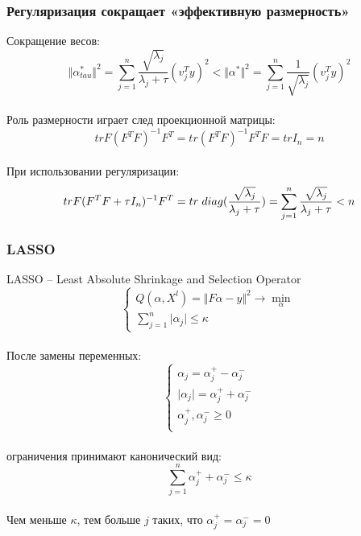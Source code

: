 \documentclass[12pt]{beamer}
\begin{document}
\begin{frame}\frametitle{Регуляризация сокращает «эффективную размерность»}
Сокращение весов:\\
$$\Vert \alpha_{tau}^* \Vert^2 = \sum\limits_{j=1}^n \frac{\sqrt{\lambda_j}}{\lambda_j + \tau} (v^T_j y)^2 < \Vert \alpha^* \Vert^2  = \sum\limits_{j=1}^n \frac{1}{\sqrt{\lambda_j}} (v_j^Ty)^2$$\\
Роль размерности играет след проекционной матрицы:\\
$$tr F(F^TF)^{-1}F^T = tr(F^TF)^{-1}F^TF = tr I_n = n$$\\
При использовании регуляризации:\\
$$tr F(F^TF + \tau I_n)^{-1}F^T = tr \hspace{1mm}  diag(\frac{\sqrt{\lambda_j}}{\lambda_j + \tau})= \sum\limits_{j=1}^n \frac{\sqrt{\lambda_j}}{\lambda_j + \tau } < n $$
\end{frame}

\begin{frame}\frametitle{LASSO}
LASSO -- Least Absolute Shrinkage and Selection Operator\\
$$
\begin{cases} Q(\alpha,X^l) = \Vert F\alpha - y \Vert^2 \rightarrow \min\limits_{\alpha} \\
\sum_{j=1}^n \vert \alpha_j \vert \leq \kappa
\end{cases}
$$\\
После замены переменных:\\
$$
\begin{cases} \alpha_j = \alpha_j^+ - \alpha_j^-\\
\vert \alpha_j \vert = \alpha_j^+ + \alpha_j^-\\
\alpha_j^+, \alpha_j^- \geq 0\\
\end{cases}
$$\\
ограничения принимают канонический вид:\\
$$\sum\limits_{j=1}^n \alpha_j^+ + \alpha_j^- \leq \kappa$$\\
Чем меньше $\kappa$, тем больше $j$ таких, что $\alpha_j^+ = \alpha_j^- = 0$
\end{frame}
\end{document}
